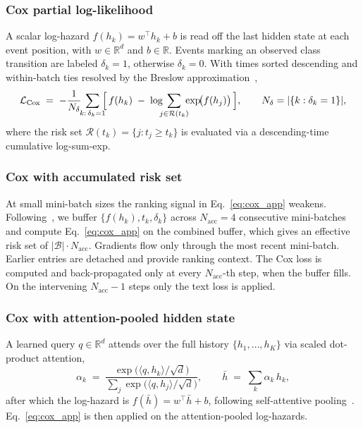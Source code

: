 \documentclass{article}
\begin{document}
\subsubsection{Cox partial log-likelihood}
A scalar log-hazard $f(h_k) = w^\top h_k + b$ is read off the last hidden state at each event position, with $w \in \mathbb{R}^d$ and $b \in \mathbb{R}$.
Events marking an observed class transition are labeled $\delta_k = 1$, otherwise $\delta_k = 0$.
With times sorted descending and within-batch ties resolved by the Breslow approximation~\citep{breslow1972contribution,cox1972regression},
\begin{equation}
    \mathcal{L}_{\text{Cox}}
    \;=\; -\frac{1}{N_\delta}\!\! \sum_{k:\, \delta_k = 1}\!\!
    \Bigl[\, f(h_k)
    \;-\; \log \!\!\!\sum_{j \in \mathcal{R}(t_k)}\!\!\! \exp\!\bigl(f(h_j)\bigr) \,\Bigr],
    \qquad N_\delta = |\{k: \delta_k = 1\}|,
    \label{eq:cox_app}
\end{equation}
where the risk set $\mathcal{R}(t_k) = \{j : t_j \geq t_k\}$ is evaluated via a descending-time cumulative log-sum-exp.

\subsubsection{Cox with accumulated risk set}
At small mini-batch sizes the ranking signal in Eq.~\eqref{eq:cox_app} weakens.
Following~\citep{katzman2018deepsurv,kvamme2019time}, we buffer $\{f(h_k), t_k, \delta_k\}$ across $N_{\text{acc}} = 4$ consecutive mini-batches and compute Eq.~\eqref{eq:cox_app} on the combined buffer, which gives an effective risk set of $|\mathcal{B}| \cdot N_{\text{acc}}$.
Gradients flow only through the most recent mini-batch. Earlier entries are detached and provide ranking context.
The Cox loss is computed and back-propagated only at every $N_{\text{acc}}$-th step, when the buffer fills. On the intervening $N_{\text{acc}}{-}1$ steps only the text loss is applied.

\subsubsection{Cox with attention-pooled hidden state}
A learned query $q \in \mathbb{R}^d$ attends over the full history $\{h_1, \ldots, h_K\}$ via scaled dot-product attention,
\begin{equation}
    \alpha_k
    \;=\; \frac{\exp\bigl(\langle q, h_k \rangle / \sqrt{d}\bigr)}
               {\sum_j \exp\bigl(\langle q, h_j \rangle / \sqrt{d}\bigr)},
    \qquad
    \bar h
    \;=\; \sum_k \alpha_k\, h_k,
    \label{eq:attn_pool}
\end{equation}
after which the log-hazard is $f(\bar h) = w^\top \bar h + b$, following self-attentive pooling~\citep{lin2017structured}.
Eq.~\eqref{eq:cox_app} is then applied on the attention-pooled log-hazards.
\end{document}
